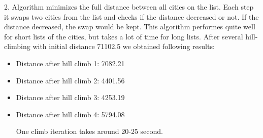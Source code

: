 \documentclass[a4paper, 12pt]{article}
\begin{document}
\begin{enumerate}
	
	2. Algorithm minimizes the full distance between all cities on the list. Each step it swaps two cities from the list and checks if the distance decreased or not. If the distance decreased, the swap would be kept. This algorithm performes quite well for short lists of the cities, but takes a lot of time for long lists. After several hill-climbing with initial distance 71102.5  we obtained following results: 
	\begin{itemize}
	\item Distance after hill climb 1: 7082.21

	\item Distance after hill climb 2: 4401.56

	\item Distance after hill climb 3: 4253.19

\item Distance after hill climb 4: 5794.08

One climb iteration takes around 20-25 second. 
	\end{itemize}
	

	
    \end{enumerate}
    
\end{document}
